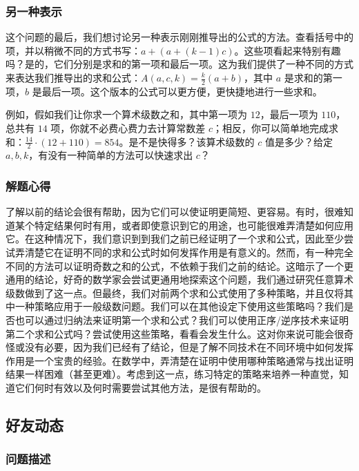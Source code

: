 \subsubsection*{另一种表示}

这个问题的最后，我们想讨论另一种表示刚刚推导出的公式的方法。查看括号中的项，并以稍微不同的方式书写：$a+ (a+ (k-1)c)$。这些项看起来特别有趣吗？是的，它们分别是求和的第一项和最后一项。这为我们提供了一种不同的方式来表达我们推导出的求和公式：$A(a, c, k) = \frac{k}{2}(a + b)$，其中 $a$ 是求和的第一项，$b$ 是最后一项。这个版本的公式可以更方便，更快捷地进行一些求和。

例如，假如我们让你求一个算术级数之和，其中第一项为 $12$，最后一项为 $110$，总共有 $14$ 项，你就不必费心费力去计算常数差 $c$；相反，你可以简单地完成求和：$\frac{14}{2} \cdot (12 + 110) = 854$。是不是快得多？该算术级数的 $c$ 值是多少？给定 $a,b,k$，有没有一种简单的方法可以快速求出 $c$？

\subsubsection*{解题心得}

了解以前的结论会很有帮助，因为它们可以使证明更简短、更容易。有时，很难知道某个特定结果何时有用，或者即使意识到它的用途，也可能很难弄清楚如何应用它。在这种情况下，我们意识到到我们之前已经证明了一个求和公式，因此至少尝试弄清楚它在证明不同的求和公式时如何发挥作用是有意义的。然而，有一种完全不同的方法可以证明奇数之和的公式，不依赖于我们之前的结论。这暗示了一个更通用的结论，好奇的数学家会尝试更通用地探索这个问题，我们通过研究任意算术级数做到了这一点。但最终，我们对前两个求和公式使用了多种策略，并且仅将其中一种策略应用于一般级数问题。我们可以在其他设定下使用这些策略吗？我们是否也可以通过归纳法来证明第一个求和公式？我们可以使用正序/逆序技术来证明第二个求和公式吗？尝试使用这些策略，看看会发生什么。这对你来说可能会很奇怪或没有必要，因为我们已经有了结论，但是了解不同技术在不同环境中如何发挥作用是一个宝贵的经验。在数学中，弄清楚在证明中使用哪种策略通常与找出证明结果一样困难（甚至更难）。考虑到这一点，练习特定的策略来培养一种直觉，知道它们何时有效以及何时需要尝试其他方法，是很有帮助的。

\subsection{好友动态}

\subsubsection*{问题描述}

